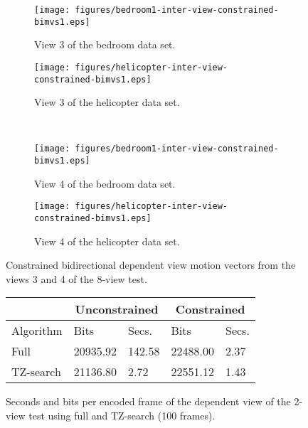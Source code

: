 \documentclass[12pt]{article}
\begin{document}
\begin{figure}
\centering
\begin{subfigure}{.4\textwidth}
\centering
\texttt{[image: figures/bedroom1-inter-view-constrained-bimvs1.eps]}
\caption{View 3 of the bedroom data set.}
\end{subfigure} \hspace{.8in}
\begin{subfigure}{.4\textwidth}
\centering
\texttt{[image: figures/helicopter-inter-view-constrained-bimvs1.eps]}
\caption{View 3 of the helicopter data set.}
\end{subfigure} \\ \vspace{.3in}
\begin{subfigure}{.4\textwidth}
\centering
\texttt{[image: figures/bedroom1-inter-view-constrained-bimvs1.eps]}
\caption{View 4 of the bedroom data set.}
\end{subfigure} \hspace{.8in}
\begin{subfigure}{.4\textwidth}
\centering
\texttt{[image: figures/helicopter-inter-view-constrained-bimvs1.eps]}
\caption{View 4 of the helicopter data set.}
\end{subfigure}
\caption{
Constrained bidirectional dependent view motion vectors from the views 3 and 4
of the 8-view test.
}
\end{figure}

\pagebreak
\begin{figure}
\centering\small
\begin{tabular}{|l|l|l|l|l|}
\multicolumn{1}{c}{} & \multicolumn{2}{c}{Unconstrained} & \multicolumn{2}{c}{Constrained} \\ \hline
Algorithm            & Bits            & Secs.           & Bits            & Secs.         \\ \hline
Full                 & 20935.92        & 142.58          & 22488.00        & 2.37          \\ \hline
TZ-search            & 21136.80        & 2.72            & 22551.12        & 1.43          \\ \hline
\end{tabular}
\caption{
Seconds and bits per encoded frame of the dependent view of the 2-view test
using full and TZ-search (100 frames).
}
\end{figure}
\end{document}
